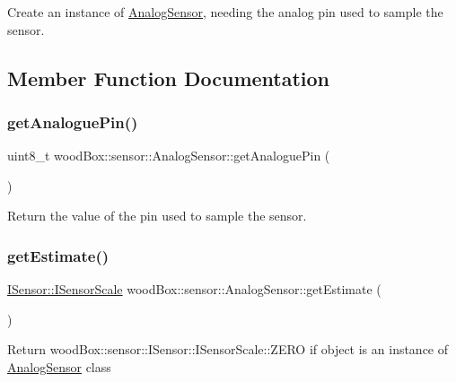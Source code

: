Create an instance of \mbox{\hyperlink{classwood_box_1_1sensor_1_1_analog_sensor}{Analog\+Sensor}}, needing the analog pin used to sample the sensor. 

\subsection{Member Function Documentation}
\mbox{\label{classwood_box_1_1sensor_1_1_analog_sensor_a5a7c67726db40be3edd48294910b117b}} 
\subsubsection{\texorpdfstring{get\+Analogue\+Pin()}{getAnaloguePin()}}
{\footnotesize\ttfamily uint8\+\_\+t wood\+Box\+::sensor\+::\+Analog\+Sensor\+::get\+Analogue\+Pin (\begin{DoxyParamCaption}{ }\end{DoxyParamCaption})}

Return the value of the pin used to sample the sensor. \mbox{\label{classwood_box_1_1sensor_1_1_analog_sensor_a74ddcfe84f3f5b9d7010442f365c4eee}} 
\subsubsection{\texorpdfstring{get\+Estimate()}{getEstimate()}}
{\footnotesize\ttfamily \mbox{\hyperlink{classwood_box_1_1sensor_1_1_i_sensor_aa377bda61ed0d4a1d7e1a7bffe459452}{I\+Sensor\+::\+I\+Sensor\+Scale}} wood\+Box\+::sensor\+::\+Analog\+Sensor\+::get\+Estimate (\begin{DoxyParamCaption}{ }\end{DoxyParamCaption})\hspace{0.3cm}{\ttfamily [virtual]}}

Return wood\+Box\+::sensor\+::\+I\+Sensor\+::\+I\+Sensor\+Scale\+::\+Z\+E\+RO if object is an instance of \mbox{\hyperlink{classwood_box_1_1sensor_1_1_analog_sensor}{Analog\+Sensor}} class 

